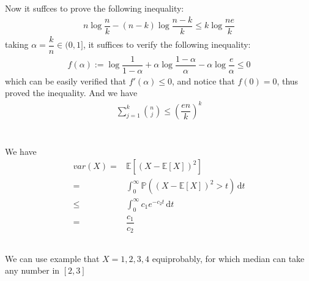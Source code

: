 \documentclass[11pt,a4paper]{ctexart}
\numberwithin{equation}{section}%
\begin{document}
Now it suffces to prove the following inequality:
\begin{align*}
    n\log \dfrac{ n }{ k } -(n-k)\log \dfrac{ n-k }{ k } \leq k\log \dfrac{ ne }{ k } 
\end{align*}
taking $ \alpha = \dfrac{ k }{ n } \in (0,1] $, it suffices to verify the following inequality:
\begin{align*}
    f(\alpha ):= \log \dfrac{ 1 }{ 1-\alpha   } + \alpha \log \dfrac{ 1-\alpha  }{ \alpha  } -\alpha \log \dfrac{ e }{ \alpha  } \leq 0  
\end{align*}
which can be easily verified that $ f'(\alpha )\leq 0 $, and notice that $ f(0)=0 $, thus proved the inequality. And we have
\begin{align*}
    \sum_{j=1}^k \binom{n}{j} \leq \left(\dfrac{ en  }{ k } \right)^k
\end{align*}




\section{}

\subsection{}
We have
\begin{align*}
    var(X)= & \mathbb{E}\left[ (X-\mathbb{E}\left[ X \right] )^2 \right]  \\
    =& \int_{0}^\infty \mathbb{P}\left( (X-\mathbb{E}\left[ X \right] )^2 > t \right) \,\mathrm{d}t \\
    \leq & \int_{0}^\infty c_1e^{-c_2t} \,\mathrm{d}t \\
    =& \dfrac{ c_1 }{ c_2 }
\end{align*}

\subsection{}

We can use example that $ X=1,2,3,4 $ equiprobably, for which median can take any number in $ [2,3] $

\subsection{}
\end{document}
